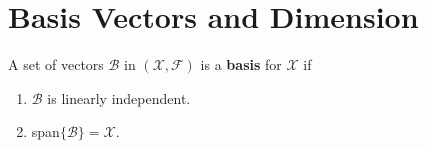 \vspace*{.2cm}
\section{Basis Vectors and Dimension}

\begin{definition}
A set of vectors $\mathcal{B}$ in $(\mathcal{X},\mathcal{F})$ is a \textbf{basis} for $\mathcal{X}$ if
\begin{enumerate}
        \renewcommand{\labelenumi}{(\alph{enumi})}
        \setlength{\itemsep}{.1cm}
    \item $\mathcal{B}$ is linearly independent.
    \item span$\{\mathcal{B}\}=\mathcal{X}$.
    \end{enumerate}
    \end{definition} 

